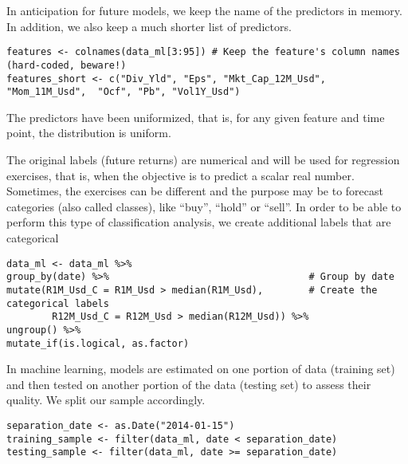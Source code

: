 In anticipation for future models, we keep the name of the predictors in memory. In addition, we also keep a much shorter list of predictors.
\begin{lstlisting}
features <- colnames(data_ml[3:95]) # Keep the feature's column names (hard-coded, beware!)
features_short <- c("Div_Yld", "Eps", "Mkt_Cap_12M_Usd", "Mom_11M_Usd",  "Ocf", "Pb", "Vol1Y_Usd")
\end{lstlisting}

The predictors have been uniformized, that is, for any given feature and time point, the distribution is uniform.

The original labels (future returns) are numerical and will be used for regression exercises, that is, when the objective is to predict a scalar real number. Sometimes, the exercises can be different and the purpose may be to forecast categories (also called classes), like “buy”, “hold” or “sell”. In order to be able to perform this type of classification analysis, we create additional labels that are categorical
\begin{lstlisting}
data_ml <- data_ml %>% 
group_by(date) %>%                                   # Group by date
mutate(R1M_Usd_C = R1M_Usd > median(R1M_Usd),        # Create the categorical labels
        R12M_Usd_C = R12M_Usd > median(R12M_Usd)) %>%
ungroup() %>%
mutate_if(is.logical, as.factor)
\end{lstlisting}

In machine learning, models are estimated on one portion of data (training set) and then tested on another portion of the data (testing set) to assess their quality. We split our sample accordingly.
\begin{lstlisting}
separation_date <- as.Date("2014-01-15")
training_sample <- filter(data_ml, date < separation_date)
testing_sample <- filter(data_ml, date >= separation_date)
\end{lstlisting}